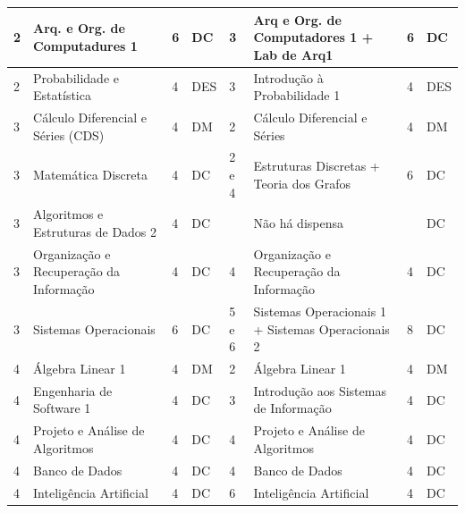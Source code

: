 \begin{longtable}{|x{1cm}|x{4cm}|x{1cm}|x{1.1cm}|x{1cm}|x{4cm}|x{1cm}|x{1.1cm}|}
\hline

2 & Arq. e Org. de Computadures 1 & 6 & DC &
3 & Arq e Org. de Computadores 1 + Lab de Arq1 & 6 & DC \\ 
 
 \hline
 
2 & Probabilidade e Estatística & 4 & DES &
3 & Introdução à Probabilidade 1 & 4 & DES \\  

\hline
\hline

3 & Cálculo Diferencial e Séries (CDS) & 4 & DM &
2 & Cálculo Diferencial e Séries & 4 & DM \\ 

\hline

3 & Matemática Discreta & 4 & DC &
2 e 4 & Estruturas Discretas + Teoria dos Grafos & 6 & DC \\ 

\hline

3 & Algoritmos e Estruturas de Dados 2 & 4 & DC &
 & Não há dispensa &  & DC \\ 

\hline

3 & Organização e Recuperação da Informação & 4 & DC &
4 & Organização e Recuperação da Informação & 4 & DC \\ 

\hline

3 & Sistemas Operacionais & 6 & DC &
5 e 6 & Sistemas Operacionais 1 + Sistemas Operacionais 2 & 8 & DC \\ 


\hline
\hline

4 & Álgebra Linear 1 & 4 & DM &
2 & Álgebra Linear 1& 4 & DM \\ 

\hline
 
4 & Engenharia de Software 1 & 4 & DC &
3 & Introdução aos Sistemas de Informação & 4 & DC \\ 

\hline

4 & Projeto e Análise de Algoritmos & 4 & DC &
4 & Projeto e Análise de Algoritmos & 4 & DC \\ 

\hline

4 & Banco de Dados & 4 & DC &
4 & Banco de Dados & 4 & DC \\ 

\hline

4 & Inteligência Artificial & 4 & DC &
6 & Inteligência Artificial & 4 & DC \\ 


\end{longtable}
